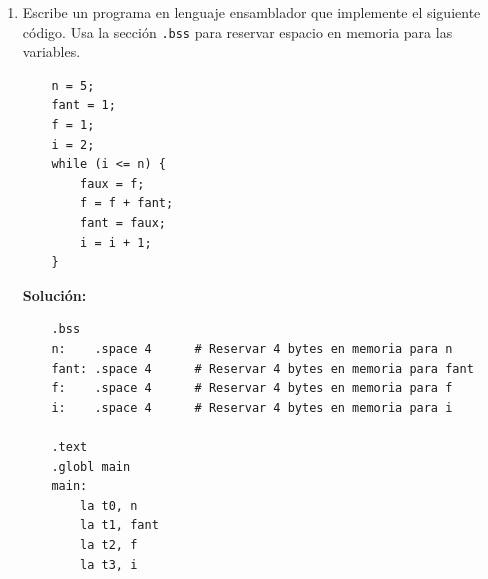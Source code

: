 \documentclass[letterpaper,12pt]{article}
\begin{document}
\begin{enumerate}
    \color{solcolor}
    \textbf{Solución:}
    \begin{verbatim}
    .data
    x:  .word 15        # Declaración de variable x inicializada en 15
    y:  .word 10        # Declaración de variable y inicializada en 10

    .text
    .globl main
    main:
        # Cargar las direcciones de las variables
        la t0, x        # t0 = dirección de x
        la t1, y        # t1 = dirección de y

        # Cargar los valores de x e y en registros de trabajo (s1 y s2)
        lw s1, 0(t0)    # s1 = x
        lw s2, 0(t1)    # s2 = y

        # Condicional: si x < y, saltar a la rama else
        blt s1, s2, else
        
        # Rama THEN: x = x + 2; y = y + 2
        addi s1, s1, 2
        addi s2, s2, 2
        j end
        
    else:
        # Rama ELSE: x = x - 2; y = y - 2
        addi s1, s1, -2
        addi s2, s2, -2
        
    end:
        # Guardar los valores modificados de vuelta en la memoria RAM
        sw s1, 0(t0)    # x = s1
        sw s2, 0(t1)    # y = s2

        # Finalizar ejecución (bucle infinito de parada)
        j .
    \end{verbatim}
    \color{black}

    \pagebreak

    \item Escribe un programa en lenguaje ensamblador que implemente el siguiente código. Usa la sección \texttt{.bss} para reservar espacio en memoria para las variables.
    \begin{verbatim}
    n = 5;
    fant = 1;
    f = 1;
    i = 2;
    while (i <= n) {
        faux = f;
        f = f + fant; 
        fant = faux; 
        i = i + 1;
    }
    \end{verbatim}

    \color{solcolor}
    \textbf{Solución:}
    \begin{verbatim}
    .bss
    n:    .space 4      # Reservar 4 bytes en memoria para n
    fant: .space 4      # Reservar 4 bytes en memoria para fant
    f:    .space 4      # Reservar 4 bytes en memoria para f
    i:    .space 4      # Reservar 4 bytes en memoria para i

    .text
    .globl main
    main:
        la t0, n
        la t1, fant
        la t2, f
        la t3, i


\end{verbatim}
\end{enumerate}
\end{document}
